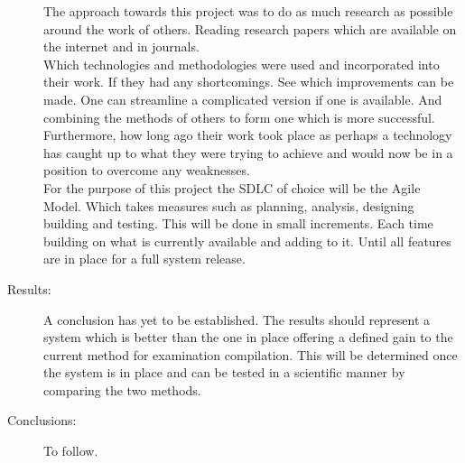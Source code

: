 \begin{description}
The approach towards this project was to do as much research as possible around the work of others. Reading research papers which are available on the internet and in journals. \\Which technologies and methodologies were used and incorporated into their work. If they had any shortcomings. See which improvements can be made. One can streamline a complicated version if one is available. And combining the methods of others to form one which is more successful. Furthermore, how long ago their work took place as perhaps a technology has caught up to what they were trying to achieve and would now be in a position to overcome any weaknesses. \\For the purpose of this project the SDLC of choice will be the Agile Model. Which takes measures such as planning, analysis, designing building and testing. This will be done in small increments. Each time building on what is currently available and adding to it. Until all features are in place for a full system release.

  \item[Results:]
  
  \begin{comment}
What's the answer? Specifically, most good computer architecture papers conclude that
something is so many percent faster, cheaper, smaller, or otherwise better than something else. Put
the result there, in numbers. Avoid vague, hand-waving results such as "very", "small", or
"significant." If you must be vague, you are only given license to do so when you can talk about
orders-of-magnitude improvement. There is a tension here in that you should not provide numbers
that can be easily misinterpreted, but on the other hand you don't have room for all the caveats.
\end{comment}

A conclusion has yet to be established. The results should represent a system which is better than the one in place offering a defined gain to the current method for examination compilation. This will be determined once the system is in place and can be tested in a scientific manner by comparing the two methods.

  \item[Conclusions:]
  
    \begin{comment}
What are the implications of your answer? Is it going to change the world (unlikely),
be a significant "win", be a nice hack, or simply serve as a road sign indicating that this path is
a waste of time (all of the previous results are useful). Are your results general, potentially
generalisable, or specific to a particular case?
\end{comment}

To follow.

\end{description}




\smallskip


